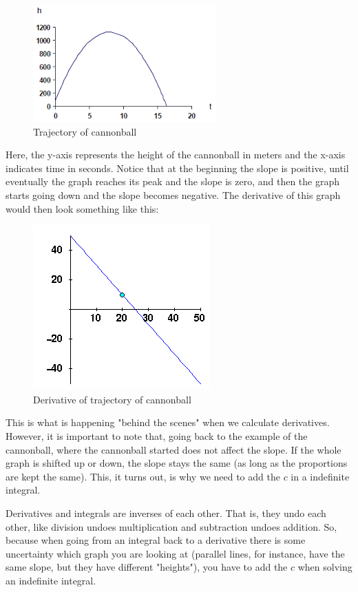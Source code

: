 \documentclass{memoir}
\begin{document}
\begin{figure}[H]
\caption{Trajectory of cannonball}
\includegraphics[scale=1]{../imgres.png}
\end{figure}

Here, the y-axis represents the height of the cannonball in meters and the x-axis indicates time in seconds. 
Notice that at the beginning the slope is positive, until eventually the graph reaches its peak and the slope is zero, and then the graph starts going down and the slope becomes negative. 
The derivative of this graph would then look something like this:

\begin{figure}[H]
\caption{Derivative of trajectory of cannonball}
\includegraphics[scale=0.8]{../derivative.png}
\end{figure}

This is what is happening "behind the scenes" when we calculate derivatives.
However, it is important to note that, going back to the example of the cannonball, where the cannonball started does not affect the slope. 
If the whole graph is shifted up or down, the slope stays the same (as long as the proportions are kept the same). 
This, it turns out, is why we need to add the $c$ in a indefinite integral. 

Derivatives and integrals are inverses of each other. 
That is, they undo each other, like division undoes multiplication and subtraction undoes addition. 
So, because when going from an integral back to a derivative there is some uncertainty which graph you are looking at (parallel lines, for instance, have the same slope, but they have different "heights"), you have to add the $c$ when solving an indefinite integral.
\end{document}
